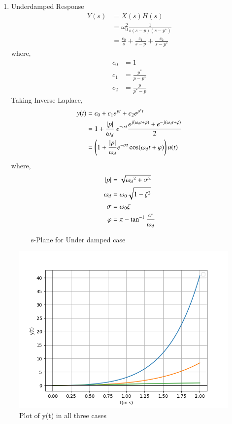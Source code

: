 \documentclass[journal,12pt,twocolumn]{IEEEtran}
\theoremstyle{remark}
\begin{document}
\begin{enumerate}
\item Underdamped Response
\begin{align}
    Y(s) &= X(s)H(s)\\
    &= \omega_0^2\frac{1}{s(s-p)(s-p^\ast)}\\
    &= \frac{c_0}{s}+\frac{c_1}{s-p}+\frac{c_2}{s-p^\ast}
\end{align}
where,
\begin{align}
    c_0 &= 1\\
    c_1 &= \frac{p^\ast}{p-p^\ast}\\
    c_2 &= \frac{p}{p^\ast-p}
\end{align}
Taking Inverse Laplace,
\begin{align}
    y(t) &= c_0+c_1e^{pt}+c_2e^{p^\ast t}\\
    &= 1+\frac{\left\vert p\right\vert}{\omega_d}\ e^{-\sigma t}\frac{
    e^{j(\omega_d t+\varphi)}+e^{-j(\omega_d t+\varphi)}}{2}\\
    &= \left(1+\frac{|p|}{\omega_d}e^{-\sigma t}\cos(\omega_d t+\varphi)\right)u(t)
\end{align}
where,
\begin{align}
    \left\vert p\right\vert&=\sqrt{{\omega_d}^2+\sigma^2}\\
    \omega_d&=\omega_0\sqrt{1-\zeta^2}\\
    \sigma&=\omega_0\zeta\\
    \varphi&=\pi-\tan^{-1}\frac{\sigma}{\omega_d}
\end{align}
\begin{figure}[!ht]
    \centering
    
    \caption{s-Plane for Under damped case}
\end{figure}
\end{enumerate}
\begin{figure}
    \centering
    \includegraphics[width = \columnwidth]{figs/plot.png}
    \caption{Plot of y(t) in all three cases}
\end{figure}
\end{document}

